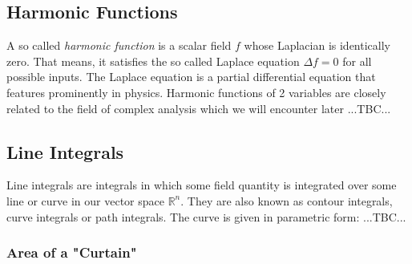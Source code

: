 


\subsection{Harmonic Functions}
A so called \emph{harmonic function} is a scalar field $f$ whose Laplacian is identically zero. That means, it satisfies the so called Laplace equation $\Delta f = 0$ for all possible inputs. The Laplace equation is a partial differential equation that features prominently in physics. Harmonic functions of 2 variables are closely related to the field of complex analysis which we will encounter later ...TBC...


\subsection{Line Integrals}
Line integrals are integrals in which some field quantity is integrated over some line or curve in our vector space $\mathbb{R}^n$. They are also known as contour integrals, curve integrals or path integrals. The curve is given in parametric form:
...TBC...

\subsubsection{Area of a "Curtain"}



